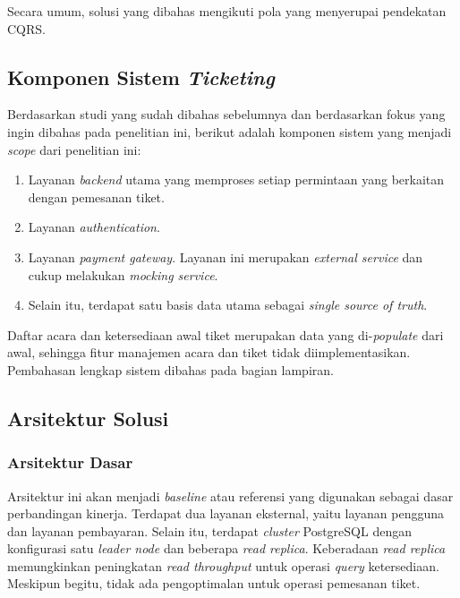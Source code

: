 Secara umum, solusi yang dibahas mengikuti pola yang menyerupai pendekatan CQRS.

\subsection{Komponen Sistem \textit{Ticketing}}

Berdasarkan studi yang sudah dibahas sebelumnya dan berdasarkan fokus yang ingin dibahas pada penelitian ini, berikut adalah komponen sistem yang menjadi \textit{scope} dari penelitian ini:

\begin{enumerate}
  \item Layanan \textit{backend} utama yang memproses setiap permintaan yang berkaitan dengan pemesanan tiket.
  \item Layanan \textit{authentication}.
  \item Layanan \textit{payment gateway}. Layanan ini merupakan \textit{external service} dan cukup melakukan \textit{mocking service}.
  \item Selain itu, terdapat satu basis data utama sebagai \textit{single source of truth}.
\end{enumerate}

Daftar acara dan ketersediaan awal tiket merupakan data yang di-\textit{populate} dari awal, sehingga fitur manajemen acara dan tiket tidak diimplementasikan. Pembahasan lengkap sistem dibahas pada bagian lampiran.

\subsection{Arsitektur Solusi}

\subsubsection{Arsitektur Dasar}

Arsitektur ini akan menjadi \textit{baseline} atau referensi yang digunakan sebagai dasar perbandingan kinerja. Terdapat dua layanan eksternal, yaitu layanan pengguna dan layanan pembayaran. Selain itu, terdapat \textit{cluster} PostgreSQL dengan konfigurasi satu \textit{leader node} dan beberapa \textit{read replica}. Keberadaan \textit{read replica} memungkinkan peningkatan \textit{read throughput} untuk operasi \textit{query} ketersediaan. Meskipun begitu, tidak ada pengoptimalan untuk operasi pemesanan tiket.

